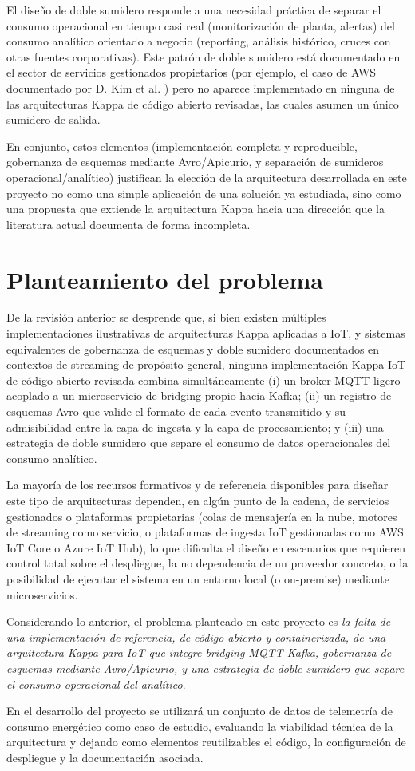El diseño de doble sumidero responde a una necesidad práctica de separar el consumo operacional en tiempo casi real (monitorización de planta, alertas) del consumo analítico orientado a negocio (reporting, análisis histórico, cruces con otras fuentes corporativas). Este patrón de doble sumidero está documentado en el sector de servicios gestionados propietarios (por ejemplo, el caso de AWS documentado por D. Kim et al. \cite{kimetal2022}) pero no aparece implementado en ninguna de las arquitecturas Kappa de código abierto revisadas, las cuales asumen un único sumidero de salida.

En conjunto, estos elementos (implementación completa y reproducible, gobernanza de esquemas mediante Avro/Apicurio, y separación de sumideros operacional/analítico) justifican la elección de la arquitectura desarrollada en este proyecto no como una simple aplicación de una solución ya estudiada, sino como una propuesta que extiende la arquitectura Kappa hacia una dirección que la literatura actual documenta de forma incompleta.

\section{Planteamiento del problema}

De la revisión anterior se desprende que, si bien existen múltiples implementaciones ilustrativas de arquitecturas Kappa aplicadas a IoT, y sistemas equivalentes de gobernanza de esquemas y doble sumidero documentados en contextos de streaming de propósito general, ninguna implementación Kappa-IoT de código abierto revisada combina simultáneamente (i) un broker MQTT ligero acoplado a un microservicio de bridging propio hacia Kafka; (ii) un registro de esquemas Avro que valide el formato de cada evento transmitido y su admisibilidad entre la capa de ingesta y la capa de procesamiento; y (iii) una estrategia de doble sumidero que separe el consumo de datos operacionales del consumo analítico.

La mayoría de los recursos formativos y de referencia disponibles para diseñar este tipo de arquitecturas dependen, en algún punto de la cadena, de servicios gestionados o plataformas propietarias (colas de mensajería en la nube, motores de streaming como servicio, o plataformas de ingesta IoT gestionadas como AWS IoT Core o Azure IoT Hub), lo que dificulta el diseño en escenarios que requieren control total sobre el despliegue, la no dependencia de un proveedor concreto, o la posibilidad de ejecutar el sistema en un entorno local (o on-premise) mediante microservicios.

Considerando lo anterior, el problema planteado en este proyecto es \textit{la falta de una implementación de referencia, de código abierto y containerizada, de una arquitectura Kappa para IoT que integre bridging MQTT-Kafka, gobernanza de esquemas mediante Avro/Apicurio, y una estrategia de doble sumidero que separe el consumo operacional del analítico}.

En el desarrollo del proyecto se utilizará un conjunto de datos de telemetría de consumo energético como caso de estudio, evaluando la viabilidad técnica de la arquitectura y dejando como elementos reutilizables el código, la configuración de despliegue y la documentación asociada.
